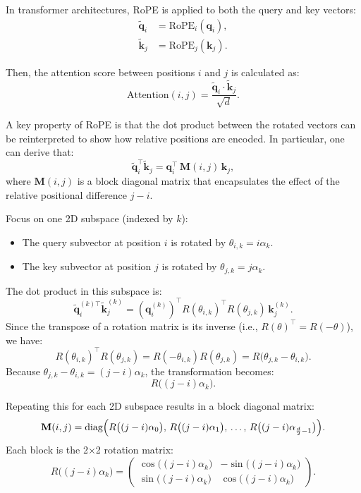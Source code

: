 In transformer architectures, RoPE is applied to both the query and key vectors:
\[
\begin{aligned}
\tilde{\mathbf{q}}_i &= \text{RoPE}_i(\mathbf{q}_i), \\
\tilde{\mathbf{k}}_j &= \text{RoPE}_j(\mathbf{k}_j).
\end{aligned}
\]

Then, the attention score between positions \(i\) and \(j\) is calculated as:
\[
\text{Attention}(i, j) = \frac{\tilde{\mathbf{q}}_i \cdot \tilde{\mathbf{k}}_j}{\sqrt{d}}.
\]

A key property of RoPE is that the dot product between the rotated vectors can be reinterpreted to show how relative positions are encoded. In particular, one can derive that:
\[
\tilde{\mathbf{q}}_i^\top \tilde{\mathbf{k}}_j = \mathbf{q}_i^\top\, \mathbf{M}(i,j)\, \mathbf{k}_j,
\]
where \(\mathbf{M}(i,j)\) is a block diagonal matrix that encapsulates the effect of the relative positional difference \(j-i\).



Focus on one 2D subspace (indexed by \(k\)):
\begin{itemize}
	\item The query subvector at position \(i\) is rotated by \(\theta_{i,k} = i\alpha_k\).
	\item The key subvector at position \(j\) is rotated by \(\theta_{j,k} = j\alpha_k\).
\end{itemize}

The dot product in this subspace is:
\[
\tilde{\mathbf{q}}_i^{(k)\top} \tilde{\mathbf{k}}_j^{(k)} 
= \left(\mathbf{q}_i^{(k)}\right)^\top R(\theta_{i,k})^\top R(\theta_{j,k}) \, \mathbf{k}_j^{(k)}.
\]
Since the transpose of a rotation matrix is its inverse (i.e., \(R(\theta)^\top = R(-\theta)\)), we have:
\[
R(\theta_{i,k})^\top R(\theta_{j,k}) = R(-\theta_{i,k})R(\theta_{j,k}) = R\bigl(\theta_{j,k} - \theta_{i,k}\bigr).
\]
Because \(\theta_{j,k} - \theta_{i,k} = (j-i)\alpha_k\), the transformation becomes:
\[
R\bigl((j-i)\alpha_k\bigr).
\]

Repeating this for each 2D subspace results in a block diagonal matrix:
\[
\mathbf{M}(i,j) = \text{diag}\Bigl(
R\bigl((j-i)\alpha_0\bigr),\,
R\bigl((j-i)\alpha_1\bigr),\,
\ldots,\,
R\bigl((j-i)\alpha_{\frac{d}{2}-1}\bigr)
\Bigr).
\]
Each block is the 2×2 rotation matrix:
\[
R\bigl((j-i)\alpha_k\bigr)
= \begin{pmatrix}
\cos\bigl((j-i)\alpha_k\bigr) & -\sin\bigl((j-i)\alpha_k\bigr) \\
\sin\bigl((j-i)\alpha_k\bigr) & \cos\bigl((j-i)\alpha_k\bigr)
\end{pmatrix}.
\]


